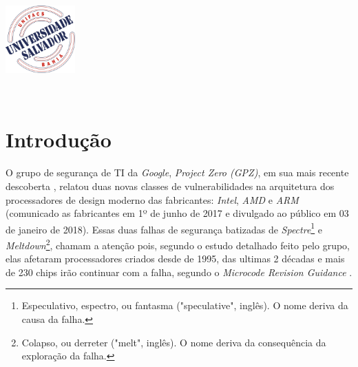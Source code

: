 \documentclass[
	12pt,				%
	openright,			%
	oneside,            %
	a4paper,			%
	chapter=TITLE,		%
	section=TITLE,		%
	subsection=TITLE,	%
	subsubsection=TITLE,%
	english,			%
	brazil,				%
]{abntex2}
\renewcommand{\imprimircapa}{%
\begin{capa}%
\begin{center}
\includegraphics[width=0.2\textwidth]{logo_unifacs.jpg}
\par
{\bfseries\large\imprimirinstituicao}
\end{center}
\vspace*{1cm}
\begin{center}
{\bfseries\large\MakeUppercase\imprimirautor}
\end{center}
\vfill
\begin{center}
\bfseries\Large\MakeUppercase\imprimirtitulo
\end{center}
\vfill
\begin{center}
\bfseries\large\imprimirlocal
\\
\bfseries\large\imprimirdata
\end{center}
\vspace*{1cm}
\end{capa}
}
\begin{document}

\frenchspacing 


\pretextual

\imprimircapa

\imprimirfolhaderosto

\tableofcontents*
\cleardoublepage


\textual

\pagestyle{emptystyle}

\chapter{Introdução}

O grupo de segurança de TI da \emph{Google}, \emph{Project Zero (GPZ)}, em sua mais recente descoberta \cite{googleprojectzero}, relatou duas novas classes de vulnerabilidades na arquitetura dos processadores de design moderno das fabricantes: \emph{Intel}, \emph{AMD} e \emph{ARM} (comunicado as fabricantes em 1º de junho de 2017 e divulgado ao público em 03 de janeiro de 2018). Essas duas falhas de segurança batizadas de \emph{Spectre}\footnote{Especulativo, espectro, ou fantasma ("speculative", inglês). O nome deriva da causa da falha.} e \emph{Meltdown}\footnote{Colapso, ou derreter ("melt", inglês). O nome deriva da consequência da exploração da falha.}, chamam a atenção pois, segundo o estudo detalhado feito pelo grupo, elas afetaram processadores criados desde de 1995, das ultimas 2 décadas e mais de 230 chips irão continuar com a falha, segundo o \emph{Microcode Revision Guidance} \cite{intel-mug}.
\end{document}

